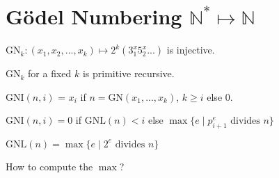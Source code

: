 \section{G\"{o}del Numbering \texorpdfstring{\(\mathbb{N}^* \mapsto \mathbb{N}\)}{N* ↦ N}}

\begin{definition}
\(\text{GN}_k: (x_1, x_2, ... , x_k) \mapsto 2^k (3^x_1 5^x_2 ...)\) is injective.
\end{definition}

\begin{observation}
\(\text{GN}_k\) for a fixed \(k\) is primitive recursive.
\end{observation}

\begin{definition}
\(\text{GNI}(n,i)\) = \(x_i\) if
\(n=\text{GN}(x_1, ..., x_k)\), \(k \ge i\) else \(0\).

\(\text{GNI}(n,i) = 0\) if \(\text{GNL}(n) < i\) else
\(\max\{ e \mid p_{i+1}^e \text{ divides } n \}\)

\(\text{GNL}(n) = \max\{e\mid 2^e \text{ divides } n\}\)
\end{definition}

How to compute the $\max$?